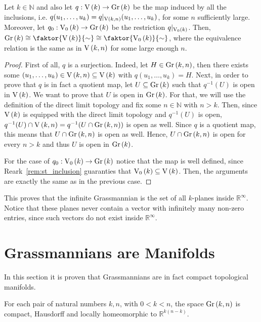 \begin{proposition} Let $k\in\mathbb{N}$ and also let $q:\St{k}\to\Gr{k}$ be the map induced by all the inclusions, i.e. $q(u_1,\ldots,u_k)=q|_{\St{k}{n}}(u_1,\ldots,u_k)$, for some $n$ sufficiently large. Moreover, let $q_0:\StO{k}\to\Gr{k}$ be the restriction $q|_{\StO{k}}$. Then, $\Gr{k}\cong\faktor{\St{k}}{\sim}\cong\faktor{\StO{k}}{\sim}$, where the equivalence relation is the same as in $\St{k}{n}$ for some large enough $n$.
\end{proposition}
\begin{proof} First of all, $q$ is a surjection. Indeed, let $H\in\Gr{k}{n}$, then there exists some $(u_1,\ldots,u_k)\in\St{k}{n}\subseteq\St{k}$ with $q(u_1,\ldots,u_k)=H$. Next, in order to prove that $q$ is in fact a quotient map, let $U\subseteq\Gr{k}$ such that $q^{-1}(U)$ is open in $\St{k}$. We want to prove that $U$ is open in $\Gr{k}$. For that, we will use the definition of the direct limit topology and fix some $n\in\mathbb{N}$ with $n>k$. Then, since $\St{k}$ is equipped with the direct limit topology and $q^{-1}(U)$ is open, $q^{-1}(U)\cap\St{k}{n}=q^{-1}(U\cap\Gr{k}{n})$ is open as well. Since $q$ is a quotient map, this means that $U\cap\Gr{k}{n}$ is open as well. Hence, $U\cap\Gr{k}{n}$ is open for every $n>k$ and thus $U$ is open in $\Gr{k}$.

For the case of $q_0:\StO{k}\to\Gr{k}$ notice that the map is well defined, since Reark~\ref{rem:st_inclusion} guaranties that $\StO{k}\subseteq\St{k}$. Then, the arguments are exactly the same as in the previous case.
\end{proof}
\begin{remark} This proves that the infinite Grassmannian is the set of all $k$-planes inside $\mathbb{R}^{\infty}$. Notice that these planes never contain a vector with infinitely many non-zero entries, since such vectors do not exist inside $\mathbb{R}^{\infty}$.
\end{remark}

\section{Grassmannians are Manifolds}
In this section it is proven that Grassmannians are in fact compact topological manifolds.
\begin{lemma}\label{lem:gr_manifold} For each pair of natural numbers $k,n$, with $0<k<n$, the space $\Gr{k}{n}$ is compact, Hausdorff and locally homeomorphic to $\mathbb{R}^{k(n-k)}$.
\end{lemma}

